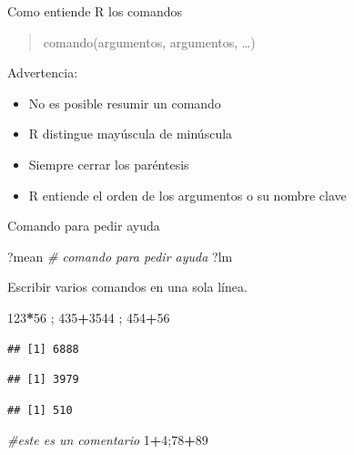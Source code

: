 \documentclass[
]{book}
\newenvironment{Shaded}{\begin{snugshade}}{\end{snugshade}}
\newcommand{\CommentTok}[1]{\textcolor[rgb]{0.56,0.35,0.01}{\textit{#1}}}
\newcommand{\DecValTok}[1]{\textcolor[rgb]{0.00,0.00,0.81}{#1}}
\newcommand{\NormalTok}[1]{#1}
\newcommand{\OperatorTok}[1]{\textcolor[rgb]{0.81,0.36,0.00}{\textbf{#1}}}
\providecommand{\tightlist}{%
  \setlength{\itemsep}{0pt}\setlength{\parskip}{0pt}}
\begin{document}
Como entiende R los comandos

\begin{quote}
comando(argumentos, argumentos, \ldots)
\end{quote}

Advertencia:

\begin{itemize}
\tightlist
\item
  No es posible resumir un comando
\item
  R distingue mayúscula de minúscula
\item
  Siempre cerrar los paréntesis
\item
  R entiende el orden de los argumentos o su nombre clave
\end{itemize}

Comando para pedir ayuda

\begin{Shaded}
\begin{Highlighting}[]
\NormalTok{?mean }\CommentTok{# comando para pedir ayuda}
\NormalTok{?lm}
\end{Highlighting}
\end{Shaded}

Escribir varios comandos en una sola línea.

\begin{Shaded}
\begin{Highlighting}[]
\DecValTok{123}\OperatorTok{*}\DecValTok{56}\NormalTok{ ; }\DecValTok{435}\OperatorTok{+}\DecValTok{3544}\NormalTok{ ; }\DecValTok{454}\OperatorTok{+}\DecValTok{56}
\end{Highlighting}
\end{Shaded}

\begin{verbatim}
## [1] 6888
\end{verbatim}

\begin{verbatim}
## [1] 3979
\end{verbatim}

\begin{verbatim}
## [1] 510
\end{verbatim}

\begin{Shaded}
\begin{Highlighting}[]
\CommentTok{#este es un comentario}
\DecValTok{1}\OperatorTok{+}\DecValTok{4}\NormalTok{;}\DecValTok{78}\OperatorTok{+}\DecValTok{89}
\end{Highlighting}
\end{Shaded}
\end{document}
